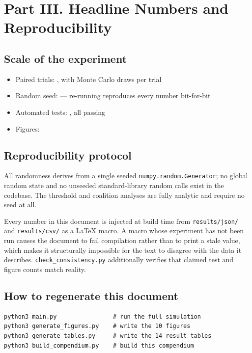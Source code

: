 \documentclass[11pt,a4paper]{article}
\newcommand{\code}[1]{\texttt{\small #1}}
\begin{document}
\clearpage
\section*{Part III. Headline Numbers and Reproducibility}

\subsection*{Scale of the experiment}
\begin{itemize}\setlength{\itemsep}{1pt}
\item Paired trials: \TotalTrials{}, with \MonteCarloTrials{} Monte Carlo draws per trial
\item Random seed: \Seed{} --- re-running reproduces every number bit-for-bit
\item Automated tests: \TestCount{}, all passing
\item Figures: \FigureCount{}
\end{itemize}

\subsection*{Reproducibility protocol}
All randomness derives from a single seeded \code{numpy.random.Generator}; no
global random state and no unseeded standard-library random calls exist in the
codebase. The threshold and coalition analyses are fully analytic and require no
seed at all.

Every number in this document is injected at build time from
\code{results/json/} and \code{results/csv/} as a \LaTeX{} macro. A macro whose
experiment has not been run causes the document to fail compilation rather than
to print a stale value, which makes it structurally impossible for the text to
disagree with the data it describes. \code{check\_consistency.py} additionally
verifies that claimed test and figure counts match reality.

\subsection*{How to regenerate this document}
\begin{verbatim}
python3 main.py                # run the full simulation
python3 generate_figures.py    # write the 10 figures
python3 generate_tables.py     # write the 14 result tables
python3 build_compendium.py    # build this compendium
\end{verbatim}
\end{document}
